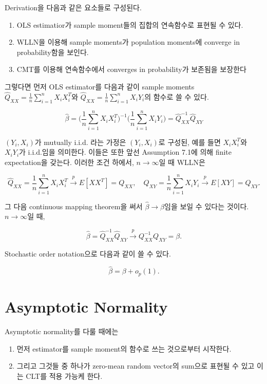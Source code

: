 \documentclass[
  letterpaper,
  DIV=11,
  numbers=noendperiod]{scrreprt}
\providecommand{\tightlist}{%
  \setlength{\itemsep}{0pt}\setlength{\parskip}{0pt}}\usepackage{longtable,booktabs,array}
\theoremstyle{definition}
\theoremstyle{plain}
\theoremstyle{definition}
\theoremstyle{definition}
\theoremstyle{remark}
\begin{document}
Derivation을 다음과 같은 요소들로 구성된다.

\begin{enumerate}
\def\labelenumi{\arabic{enumi}.}
\tightlist
\item
  OLS estimatior가 sample moment들의 집합의 연속함수로 표현될 수 있다.
\item
  WLLN을 이용해 sample moments가 population moments에 converge in
  probability함을 보인다.
\item
  CMT를 이용해 연속함수에서 converges in probability가 보존됨을 보장한다
\end{enumerate}

그렇다면 먼저 OLS estimator를 다음과 같이 sample moments
\(\hat{Q}_{XX}=\frac{1}{n}\sum_{i=1}^{n} X_i X_i^{T}\)와
\(\hat{Q}_{XX}=\frac{1}{n}\sum_{i=1}^{n} X_i Y_i\)의 함수로 쓸 수 있다.

\[
\hat{\beta} = \Big(\frac{1}{n}\sum_{i=1}^n X_i X_i^T \Big)^{-1} \Big(\frac{1}{n}\sum_{i=1}^n X_i Y_i \Big) = \hat{Q}_{XX}^{-1}\hat{Q}_{XY}
\]

\((Y_i, X_i)\)가 mutually i.i.d. 라는 가정은 \((Y_i, X_i)\)로 구성된,
예를 들면 \(X_i X_i^{T}\)와 \(X_i Y_i\)가 i.i.d.임을 의미한다. 이들은
또한 앞선 Assumption 7.1에 의해 finite expectation을 갖는다. 이러한 조건
하에서, \(n\rightarrow \infty\)일 때 WLLN은

\[
\hat{Q}_{XX} = \frac{1}{n}\sum_{i=1}^n X_i X_i^{T} \stackrel{p}{\rightarrow} E[XX^T] = Q_{XX}, \quad{} \hat{Q}_{XY} = \frac{1}{n}\sum_{i=1}^n X_i Y_i\stackrel{p}{\rightarrow} E[XY] = Q_{XY}.
\]

그 다음 continuous mapping theorem을 써서
\(\hat{\beta} \rightarrow \beta\)임을 보일 수 있다는 것이다.
\(n\rightarrow \infty\)일 때,

\[
\hat{\beta} = \hat{Q}_{XX} ^{-1}\hat{Q}_{XY} \stackrel{p}{\rightarrow}Q_{XX}^{-1}Q_{XY} = \beta.
\]

Stochastic order notation으로 다음과 같이 쓸 수 있다.

\[
\hat{\beta} = \beta + o_p (1).
\]

\section{Asymptotic Normality}\label{asymptotic-normality}

Asymptotic normality를 다룰 때에는

\begin{enumerate}
\def\labelenumi{\arabic{enumi}.}
\tightlist
\item
  먼저 estimator를 sample moment의 함수로 쓰는 것으로부터 시작한다.
\item
  그리고 그것들 중 하나가 zero-mean random vector의 sum으로 표현될 수
  있고 이는 CLT를 적용 가능케 한다.
\end{enumerate}
\end{document}
